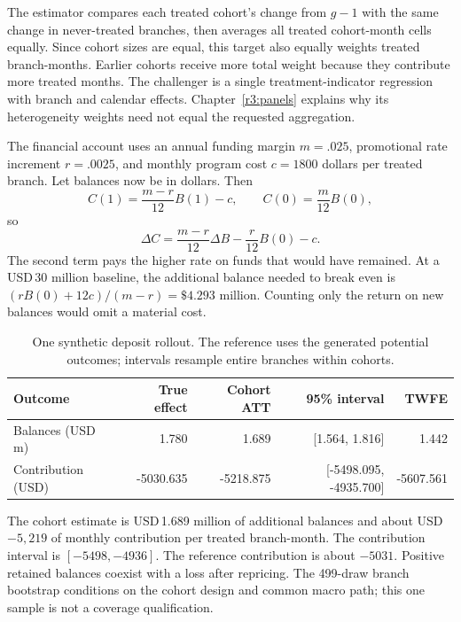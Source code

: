 The estimator compares each treated cohort's change from $g-1$ with
the same change in never-treated branches, then averages all treated
cohort-month cells equally. Since cohort sizes are equal, this target
also equally weights treated branch-months. Earlier cohorts receive
more total weight because they contribute more treated months.
The challenger is a single treatment-indicator regression with branch
and calendar effects. Chapter~\ref{r3:panels} explains why its
heterogeneity weights need not equal the requested aggregation.

The financial account uses an annual funding margin $m=.025$, promotional
rate increment $r=.0025$, and monthly program cost $c=1800$ dollars
per treated branch. Let balances now be in dollars. Then
\[
 C(1)=\frac{m-r}{12}B(1)-c,\qquad C(0)=\frac m{12}B(0),
\]
so
\begin{equation}
 \Delta C=\frac{m-r}{12}\Delta B-\frac r{12}B(0)-c.
 \label{r3:deposit-account}
\end{equation}
The second term pays the higher rate on funds that would have remained.
At a USD\,30 million baseline, the additional balance needed to break
even is $(rB(0)+12c)/(m-r)=\$4.293$ million. Counting only the return
on new balances would omit a material cost.

\begin{table}[htbp]\centering\small


\begin{tabular}{@{}lrrrr@{}}
\toprule
Outcome & True effect & Cohort ATT & 95\% interval & TWFE\\
\midrule
Balances (USD m) & 1.780 & 1.689 & [1.564, 1.816] & 1.442\\
Contribution (USD) & -5030.635 & -5218.875 & [-5498.095, -4935.700] & -5607.561\\
\bottomrule
\end{tabular}



\caption{One synthetic deposit rollout. The reference uses the generated
potential outcomes; intervals resample entire branches within cohorts.}
\label{r3:deposit-results}
\end{table}

The cohort estimate is USD\,1.689 million of additional balances and
about USD\,$-5,219$ of monthly contribution per treated branch-month.
The contribution interval is $[-5498,-4936]$. The reference contribution
is about $-5031$. Positive retained balances coexist with a loss after
repricing. The 499-draw branch bootstrap conditions on the cohort design
and common macro path; this one sample is not a coverage qualification.

